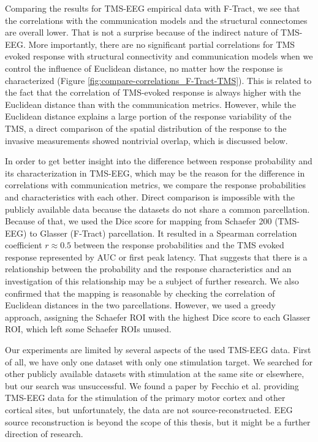 Comparing the results for TMS-EEG empirical data with F-Tract, we see that the correlations with the communication models and the structural connectomes are overall lower. That is not a surprise because of the indirect nature of TMS-EEG. More importantly, there are no significant partial correlations for TMS evoked response with structural connectivity and communication models when we control the influence of Euclidean distance, no matter how the response is characterized (Figure \ref{fig:compare-correlations_F-Tract-TMS}). This is related to the fact that the correlation of TMS-evoked response is always higher with the Euclidean distance than with the communication metrics. However, while the Euclidean distance explains a large portion of the response variability of the TMS, a direct comparison of the spatial distribution of the response to the invasive measurements showed nontrivial overlap, which is discussed below.

In order to get better insight into the difference between response probability and its characterization in TMS-EEG, which may be the reason for the difference in correlations with communication metrics, we compare the response probabilities and characteristics with each other. Direct comparison is impossible with the publicly available data because the datasets do not share a common parcellation. Because of that, we used the Dice score for mapping from Schaefer 200 (TMS-EEG) to Glasser (F-Tract) parcellation. It resulted in a Spearman correlation coefficient $r\approx0.5$ between the response probabilities and the TMS evoked response represented by AUC or first peak latency. That suggests that there is a relationship between the probability and the response characteristics and an investigation of this relationship may be a subject of further research. We also confirmed that the mapping is reasonable by checking the correlation of Euclidean distances in the two parcellations. However, we used a greedy approach, assigning the Schaefer ROI with the highest Dice score to each Glasser ROI, which left some Schaefer ROIs unused. 

Our experiments are limited by several aspects of the used TMS-EEG data. First of all, we have only one dataset with only one stimulation target. We searched for other publicly available datasets with stimulation at the same site or elsewhere, but our search was unsuccessful. We found a paper by Fecchio et al. \cite{fecchio_spectral_2017} providing TMS-EEG data for the stimulation of the primary motor cortex and other cortical sites, but unfortunately, the data are not source-reconstructed. EEG source reconstruction is beyond the scope of this thesis, but it might be a further direction of research.

